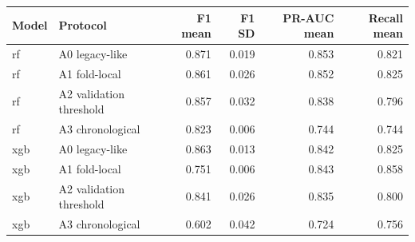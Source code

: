 \begin{tabular}{llrrrr}
\toprule Model & Protocol & F1 mean & F1 SD & PR-AUC mean & Recall mean \\
\midrule
rf & A0 legacy-like & 0.871 & 0.019 & 0.853 & 0.821 \\
rf & A1 fold-local & 0.861 & 0.026 & 0.852 & 0.825 \\
rf & A2 validation threshold & 0.857 & 0.032 & 0.838 & 0.796 \\
rf & A3 chronological & 0.823 & 0.006 & 0.744 & 0.744 \\
xgb & A0 legacy-like & 0.863 & 0.013 & 0.842 & 0.825 \\
xgb & A1 fold-local & 0.751 & 0.006 & 0.843 & 0.858 \\
xgb & A2 validation threshold & 0.841 & 0.026 & 0.835 & 0.800 \\
xgb & A3 chronological & 0.602 & 0.042 & 0.724 & 0.756 \\
\bottomrule
\end{tabular}
